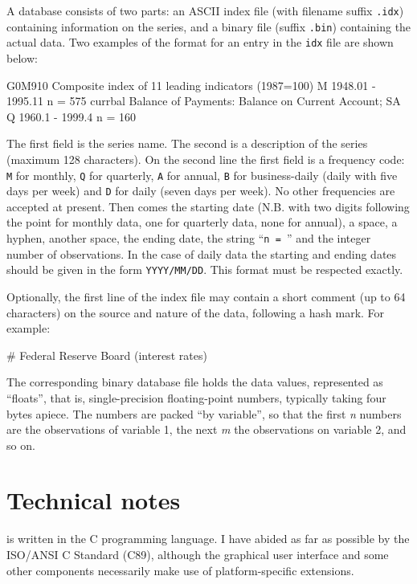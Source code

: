 A  database consists of two parts: an ASCII index file
(with filename suffix \verb+.idx+) containing information on the
series, and a binary file (suffix \verb+.bin+) containing the actual
data.  Two examples of the format for an entry in the \verb+idx+ file
are shown below:

\begin{code}
      G0M910  Composite index of 11 leading indicators (1987=100) 
      M 1948.01 - 1995.11  n = 575
      currbal Balance of Payments: Balance on Current Account; SA 
      Q 1960.1 - 1999.4 n = 160
\end{code}

The first field is the series name.  The second is a description of
the series (maximum 128 characters).  On the second line the first
field is a frequency code: \verb+M+ for monthly, \verb+Q+ for
quarterly, \verb+A+ for annual, \verb+B+ for business-daily (daily
with five days per week) and \verb+D+ for daily (seven days per week).
No other frequencies are accepted at present.  Then comes the starting
date (N.B. with two digits following the point for monthly data, one
for quarterly data, none for annual), a space, a hyphen, another
space, the ending date, the string ``\verb+n = +'' and the integer
number of observations. In the case of daily data the starting and
ending dates should be given in the form \verb+YYYY/MM/DD+. This
format must be respected exactly.

Optionally, the first line of the index file may contain a short
comment (up to 64 characters) on the source and nature of the data,
following a hash mark.  For example:

\begin{code}
      # Federal Reserve Board (interest rates)
\end{code}

The corresponding binary database file holds the data values,
represented as ``floats'', that is, single-precision floating-point
numbers, typically taking four bytes apiece.  The numbers are packed
``by variable'', so that the first \emph{n} numbers are the
observations of variable 1, the next \emph{m} the observations on
variable 2, and so on.

\chapter{Technical notes}
\label{app-technote}

 is written in the C programming language.  I have abided
as far as possible by the ISO/ANSI C Standard (C89), although the
graphical user interface and some other components necessarily make
use of platform-specific extensions.
  
